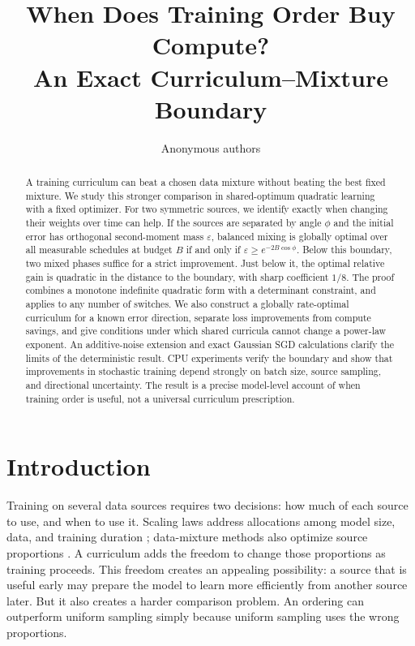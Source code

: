 \documentclass{article}
\title{When Does Training Order Buy Compute?\\An Exact Curriculum--Mixture Boundary}
\author{Anonymous authors}
\date{}
\theoremstyle{remark}\newtheorem{remark}[theorem]{Remark}
\begin{document}
\maketitle
\begin{abstract}
A training curriculum can beat a chosen data mixture without beating the best fixed mixture. We study this stronger comparison in shared-optimum quadratic learning with a fixed optimizer. For two symmetric sources, we identify exactly when changing their weights over time can help. If the sources are separated by angle $\phi$ and the initial error has orthogonal second-moment mass $\varepsilon$, balanced mixing is globally optimal over all measurable schedules at budget $B$ if and only if $\varepsilon\ge e^{-2B\cos\phi}$. Below this boundary, two mixed phases suffice for a strict improvement. Just below it, the optimal relative gain is quadratic in the distance to the boundary, with sharp coefficient $1/8$. The proof combines a monotone indefinite quadratic form with a determinant constraint, and applies to any number of switches. We also construct a globally rate-optimal curriculum for a known error direction, separate loss improvements from compute savings, and give conditions under which shared curricula cannot change a power-law exponent. An additive-noise extension and exact Gaussian SGD calculations clarify the limits of the deterministic result. CPU experiments verify the boundary and show that improvements in stochastic training depend strongly on batch size, source sampling, and directional uncertainty. The result is a precise model-level account of when training order is useful, not a universal curriculum prescription.
\end{abstract}

\section{Introduction}
Training on several data sources requires two decisions: how much of each source to use, and when to use it. Scaling laws address allocations among model size, data, and training duration \citep{kaplan2020,hoffmann2022}; data-mixture methods also optimize source proportions \citep{ye2025,shukor2025,dai2026}. A curriculum adds the freedom to change those proportions as training proceeds. This freedom creates an appealing possibility: a source that is useful early may prepare the model to learn more efficiently from another source later. But it also creates a harder comparison problem. An ordering can outperform uniform sampling simply because uniform sampling uses the wrong proportions.
\end{document}
